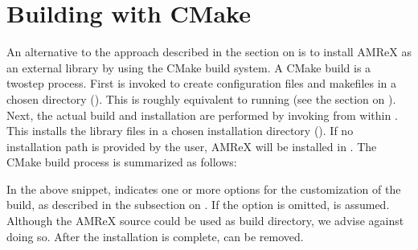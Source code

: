 \documentclass[letterpaper,10pt,english]{sphinxmanual}
\begin{document}
\section{Building with CMake}
\label{\detokenize{BuildingAMReX:building-with-cmake}}\label{\detokenize{BuildingAMReX:sec-build-cmake}}
\sphinxAtStartPar
An alternative to the approach described in the section on {\hyperref[\detokenize{BuildingAMReX:sec-build-lib}]{}}
is to install AMReX as an external library by using the CMake build system.  A
CMake build is a two\sphinxhyphen{}step process. First  is invoked to create
configuration files and makefiles in a chosen directory ().  This
is roughly equivalent to running  (see the section on
{\hyperref[\detokenize{BuildingAMReX:sec-build-lib}]{}}). Next, the actual build and installation are performed by
invoking  from within . This installs the library files
in a chosen installation directory ().  If no installation path
is provided by the user, AMReX will be installed in .
The CMake build process is summarized as follows:

\begin{sphinxVerbatim}[commandchars=\\\{\}]
\end{sphinxVerbatim}

\sphinxAtStartPar
In the above snippet, \sphinxcode{\sphinxupquote{{[}options{]}}} indicates one or more options for the
customization of the build, as described in the subsection on
{\hyperref[\detokenize{BuildingAMReX:sec-build-cmake-options}]{}}. If the option  is omitted,
 is assumed. Although the AMReX source could be used as
build directory, we advise against doing so.  After the installation is
complete,  can be removed.
\end{document}

